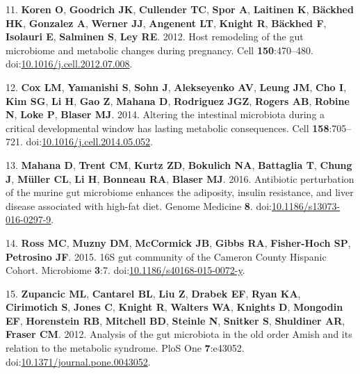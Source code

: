 \documentclass[12pt,]{article}
\begin{document}
\hypertarget{ref-Koren2012}{}
11. \textbf{Koren O}, \textbf{Goodrich JK}, \textbf{Cullender TC},
\textbf{Spor A}, \textbf{Laitinen K}, \textbf{Bäckhed HK},
\textbf{Gonzalez A}, \textbf{Werner JJ}, \textbf{Angenent LT},
\textbf{Knight R}, \textbf{Bäckhed F}, \textbf{Isolauri E},
\textbf{Salminen S}, \textbf{Ley RE}. 2012. Host remodeling of the gut
microbiome and metabolic changes during pregnancy. Cell
\textbf{150}:470--480.
doi:\href{https://doi.org/10.1016/j.cell.2012.07.008}{10.1016/j.cell.2012.07.008}.

\hypertarget{ref-Cox2014}{}
12. \textbf{Cox LM}, \textbf{Yamanishi S}, \textbf{Sohn J},
\textbf{Alekseyenko AV}, \textbf{Leung JM}, \textbf{Cho I}, \textbf{Kim
SG}, \textbf{Li H}, \textbf{Gao Z}, \textbf{Mahana D}, \textbf{Rodriguez
JGZ}, \textbf{Rogers AB}, \textbf{Robine N}, \textbf{Loke P},
\textbf{Blaser MJ}. 2014. Altering the intestinal microbiota during a
critical developmental window has lasting metabolic consequences. Cell
\textbf{158}:705--721.
doi:\href{https://doi.org/10.1016/j.cell.2014.05.052}{10.1016/j.cell.2014.05.052}.

\hypertarget{ref-Mahana2016}{}
13. \textbf{Mahana D}, \textbf{Trent CM}, \textbf{Kurtz ZD},
\textbf{Bokulich NA}, \textbf{Battaglia T}, \textbf{Chung J},
\textbf{Müller CL}, \textbf{Li H}, \textbf{Bonneau RA}, \textbf{Blaser
MJ}. 2016. Antibiotic perturbation of the murine gut microbiome enhances
the adiposity, insulin resistance, and liver disease associated with
high-fat diet. Genome Medicine \textbf{8}.
doi:\href{https://doi.org/10.1186/s13073-016-0297-9}{10.1186/s13073-016-0297-9}.

\hypertarget{ref-rossux5f16sux5f2015}{}
14. \textbf{Ross MC}, \textbf{Muzny DM}, \textbf{McCormick JB},
\textbf{Gibbs RA}, \textbf{Fisher-Hoch SP}, \textbf{Petrosino JF}. 2015.
16S gut community of the Cameron County Hispanic Cohort. Microbiome
\textbf{3}:7.
doi:\href{https://doi.org/10.1186/s40168-015-0072-y}{10.1186/s40168-015-0072-y}.

\hypertarget{ref-zupancicux5fanalysisux5f2012}{}
15. \textbf{Zupancic ML}, \textbf{Cantarel BL}, \textbf{Liu Z},
\textbf{Drabek EF}, \textbf{Ryan KA}, \textbf{Cirimotich S},
\textbf{Jones C}, \textbf{Knight R}, \textbf{Walters WA},
\textbf{Knights D}, \textbf{Mongodin EF}, \textbf{Horenstein RB},
\textbf{Mitchell BD}, \textbf{Steinle N}, \textbf{Snitker S},
\textbf{Shuldiner AR}, \textbf{Fraser CM}. 2012. Analysis of the gut
microbiota in the old order Amish and its relation to the metabolic
syndrome. PloS One \textbf{7}:e43052.
doi:\href{https://doi.org/10.1371/journal.pone.0043052}{10.1371/journal.pone.0043052}.
\end{document}

